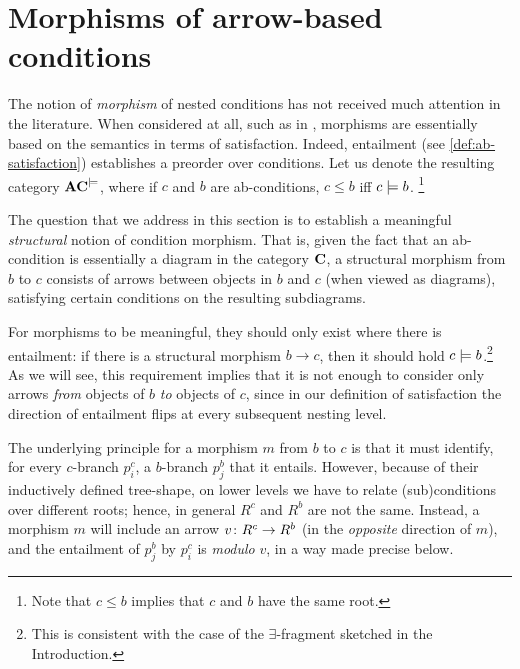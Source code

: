\section{Morphisms of arrow-based conditions}

The notion of \emph{morphism} of nested conditions has not received much attention in the literature. When considered at all, such as in \cite{bchk:conditional-reactive-systems,sksclo:coinductive-techniques-for-satisfiability}, morphisms are essentially based on the semantics in terms of satisfaction. Indeed, entailment (see \cref{def:ab-satisfaction}) establishes a preorder over conditions. Let us denote the resulting category $\mathbf{AC}^{\models}$, where if $c$ and $b$ are ab-conditions, $c \leq b$ iff $c \models b$.%
\footnote{Note that $c \leq b$ implies that $c$ and $b$ have the same root.} 
 
The question that we address in this section is to establish a meaningful \emph{structural} notion of condition morphism. That is, given the fact that an ab-condition is essentially a diagram in the category $\mathbf{C}$, a structural morphism from $b$ to $c$ consists of arrows between objects in $b$ and $c$ (when viewed as diagrams), satisfying certain conditions on the resulting subdiagrams. 

For morphisms to be meaningful,  they should only exist where there is entailment: 
if there is a structural morphism $b \to c$, then it should hold $c \models b$.\footnote{This is consistent with the case of the $\exists$-fragment sketched in the Introduction.} As we will see, this requirement implies that it is not enough to consider only arrows \emph{from} objects of $b$ \emph{to} objects of $c$, since in our definition of satisfaction the direction of entailment flips at every subsequent nesting level. 



The underlying principle for a morphism $m$ from $b$ to $c$ is that it must identify, for every $c$-branch $p^c_i$, a $b$-branch $p^b_j$ that it entails. However, because of their inductively defined tree-shape, on lower levels we have to relate (sub)conditions over different roots; hence, in general $R^c$ and $R^b$ are not the same. Instead, a morphism $m$ will include an arrow $v\colon R^c\rightarrow R^b$ (in the \emph{opposite} direction of $m$), and the entailment of $p^b_j$ by $p^c_i$ is \emph{modulo} $v$, in a way made precise below.

